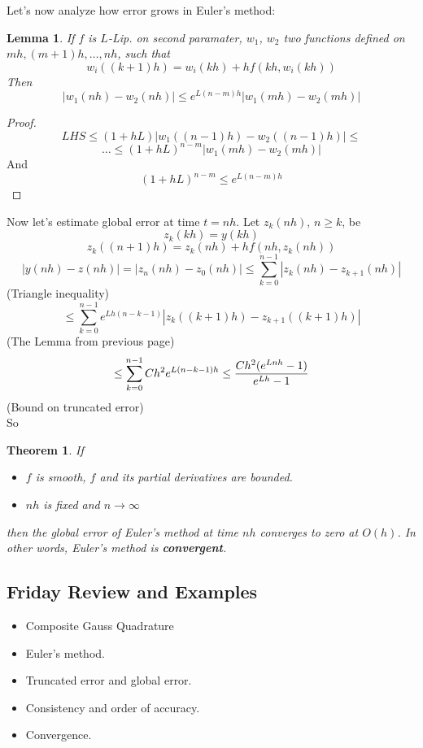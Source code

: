 \documentclass[20pt]{article} %
\theoremstyle{break}
\newtheorem{lem}[definition]{Lemma}
\newtheorem{thm}[definition]{Theorem}
\begin{document}
\newpage

Let's now analyze how error grows in Euler's method:

\begin{lem}
  If $f$ is $L$-Lip. on second paramater, $w_1$, $w_2$ two functions defined on $mh, (m+1)h, \dots, nh$, such that
  \[w_i((k+1)h)=w_i(kh)+hf(kh, w_i(kh))\]
  Then 
\[|w_1(nh)-w_2(nh)|\leq e^{L(n-m)h}|w_1(mh)-w_2(mh)|\]
\end{lem}

\begin{proof}
  \[LHS\leq (1+hL)|w_1((n-1)h)-w_2((n-1)h)|\leq\]
    \[\dots\leq (1+hL)^{n-m}|w_1(mh)-w_2(mh)|\]
 And \[(1+hL)^{n-m}\leq e^{L(n-m)h}\]
\end{proof}

\newpage

Now let's estimate global error at time $t=nh$. Let $z_k(nh)$, $n\geq k$, be
\[z_k(kh)=y(kh)\]
\[z_k((n+1)h)=z_k(nh)+hf(nh, z_k(nh))\]
\[|y(nh)-z(nh)|=|z_{n}(nh)-z_{0}(nh)|\leq \sum_{k=0}^{n-1}|z_k(nh)-z_{k+1}(nh)|\]
(Triangle inequality)
\[\leq \sum_{k=0}^{n-1}e^{Lh(n-k-1)}|z_k((k+1)h)-z_{k+1}((k+1)h)|\]
(The Lemma from previous page)
\[\leq \sum_{k=0}^{n-1}Ch^2 e^{L(n-k-1)h}\leq {Ch^2(e^{Lnh}-1)\over e^{Lh}-1}\]
(Bound on truncated error)\\
So
\begin{thm}
If
\begin{itemize}
\item $f$ is smooth, $f$ and its partial derivatives are bounded.
\item $nh$ is fixed and $n\rightarrow\infty$
\end{itemize}
then the global error of Euler's method at time $nh$ converges to zero at $O(h)$. In other words, Euler's method is {\bf convergent}.
\end{thm}

\newpage

\subsection{Friday Review and Examples}

\begin{itemize}
\item Composite Gauss Quadrature
\item Euler's method.
\item Truncated error and global error.
\item Consistency and order of accuracy.
\item Convergence.
\end{itemize}
\end{document}

